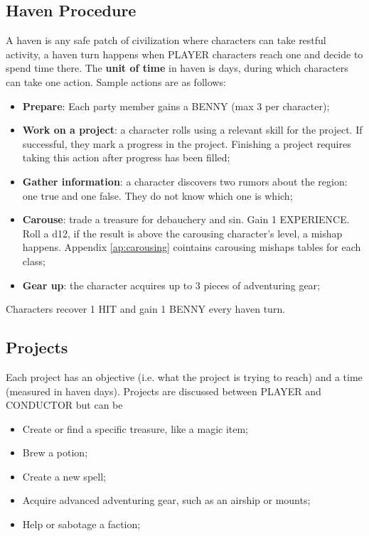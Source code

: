 \subsection{Haven Procedure}
A haven is any safe patch of civilization where characters can take restful activity, a haven turn happens when PLAYER characters reach one and decide to spend time there. The \textbf{unit of time} in haven is days, during which characters can take one action. Sample actions are as follows:
\begin{itemize}
    \item {\textbf{Prepare}: Each party member gains a BENNY (max 3 per character);}
    \item {\textbf{Work on a project}: a character rolls using a relevant skill for the project. If successful, they mark a progress in the project. Finishing a project requires taking this action after progress has been filled;}
    \item {\textbf{Gather information}: a character discovers two rumors about the region: one true and one false. They do not know which one is which;}
    \item {\textbf{Carouse}: trade a treasure for debauchery and sin. Gain 1 EXPERIENCE. Roll a d12, if the result is above the carousing character's level, a mishap happens. Appendix \ref{ap:carousing} cointains carousing mishaps tables for each class;}
    \item {\textbf{Gear up}: the character acquires up to 3 pieces of adventuring gear;}
\end{itemize}
Characters recover 1 HIT and gain 1 BENNY every haven turn.

\subsection{Projects}
Each project has an objective (i.e. what the project is trying to reach) and a time (measured in haven days). Projects are discussed between PLAYER and CONDUCTOR but can be
\begin{itemize}
    \item Create or find a specific treasure, like a magic item;
    \item Brew a potion;
    \item Create a new spell;
    \item Acquire advanced adventuring gear, such as an airship or mounts;
    \item Help or sabotage a faction;
\end{itemize}

